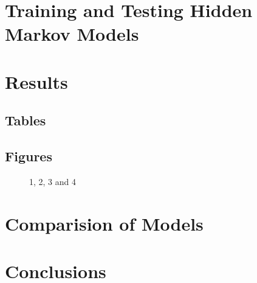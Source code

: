 \section{Training and Testing Hidden Markov Models}

\section{Results}

\subsection{Tables}

\subsection{Figures}

\begin{figure}[H]
	\centering
	\begin{minipage}[b]{0.5\linewidth}
	\end{minipage}\hfill
	\begin{minipage}[b]{0.5\linewidth}
	\end{minipage}\hfill	
	\begin{minipage}[b]{0.5\linewidth}
	\end{minipage}\hfill
	\begin{minipage}[b]{0.5\linewidth}
	\end{minipage}\hfill
	\caption{1, 2, 3 and 4}
	\label{fig:Figure1}
\end{figure} 


\section{Comparision of Models}



\section{Conclusions}


